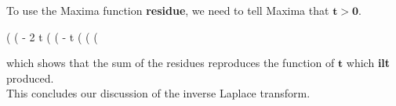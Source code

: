 \documentclass[12pt]{article}
\begin{document}
\noindent To use the Maxima function \textbf{residue}, we need to tell Maxima that $\mathbf{t > 0}$.
\begin{myVerbatim}
(%
(%
                                        - 2 t
(%
(%
                                            - t
(%
(%
(%
\end{myVerbatim}
  which shows that the sum of the residues reproduces the function of $\mathbf{t}$ which
   \textbf{ilt} produced.    \\
   
\noindent This concludes our discussion of the inverse Laplace transform.
\end{document}

